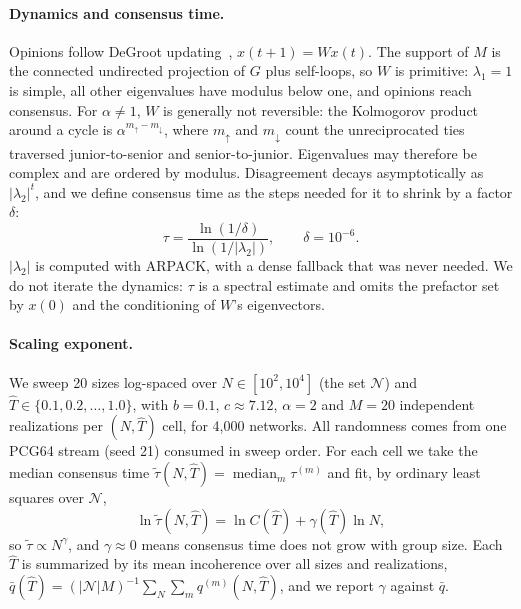 \paragraph{Dynamics and consensus time.}
Opinions follow DeGroot updating~\cite{degroot1974reaching}, $x(t+1)=Wx(t)$.
The support of $M$ is the connected undirected projection of $G$ plus
self-loops, so $W$ is primitive: $\lambda_1=1$ is simple, all other
eigenvalues have modulus below one, and opinions reach consensus. For
$\alpha\ne1$, $W$ is generally not reversible: the Kolmogorov product around a
cycle is $\alpha^{m_\uparrow-m_\downarrow}$, where $m_\uparrow$ and
$m_\downarrow$ count the unreciprocated ties traversed junior-to-senior and
senior-to-junior. Eigenvalues may therefore be complex and are ordered by
modulus. Disagreement decays asymptotically as $|\lambda_2|^t$, and we define
consensus time as the steps needed for it to shrink by a factor $\delta$:
\begin{equation}
  \tau=\frac{\ln(1/\delta)}{\ln(1/|\lambda_2|)},\qquad\delta=10^{-6}.
  \label{eq:tau}
\end{equation}
$|\lambda_2|$ is computed with ARPACK, with a dense fallback that was never
needed. We do not iterate the dynamics: $\tau$ is a spectral estimate and
omits the prefactor set by $x(0)$ and the conditioning of $W$'s eigenvectors.

\paragraph{Scaling exponent.}
We sweep 20 sizes log-spaced over $N\in[10^2,10^4]$ (the set $\mathcal N$) and
$\hat T\in\{0.1,0.2,\dots,1.0\}$, with $b=0.1$, $c\approx7.12$, $\alpha=2$ and
$M=20$ independent realizations per $(N,\hat T)$ cell, for 4{,}000 networks.
All randomness comes from one PCG64 stream (seed 21) consumed in sweep order.
For each cell we take the median consensus time
$\tilde\tau(N,\hat T)=\operatorname{median}_m\tau^{(m)}$ and fit, by ordinary
least squares over $\mathcal N$,
\begin{equation}
  \ln\tilde\tau(N,\hat T)=\ln C(\hat T)+\gamma(\hat T)\ln N ,
  \label{eq:gamma}
\end{equation}
so $\tilde\tau\propto N^{\gamma}$, and $\gamma\approx0$ means consensus time
does not grow with group size. Each $\hat T$ is summarized by its mean
incoherence over all sizes and realizations,
$\bar q(\hat T)=(|\mathcal N|M)^{-1}\sum_{N}\sum_{m}q^{(m)}(N,\hat T)$, and we
report $\gamma$ against $\bar q$.

